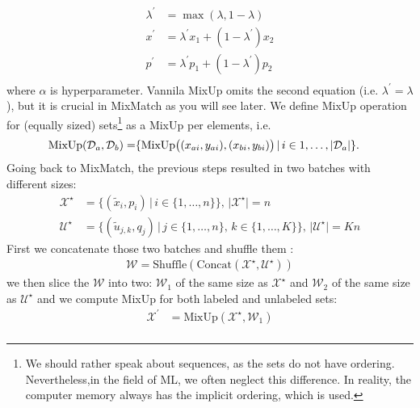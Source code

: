 \begin{enumerate}
\begin{align*}
                \lambda^\prime &= \max(\lambda,1-\lambda) \\
                x^\prime &= \lambda^\prime x_1 + (1-\lambda^\prime) x_2 \\
                p^\prime &= \lambda^\prime p_1 + (1-\lambda^\prime) p_2 \\
            \end{align*}
            where $\alpha$ is hyperparameter. Vannila MixUp omits the second equation (i.e. $\lambda^\prime = \lambda$), but it is crucial in MixMatch as you will
            see later. We define MixUp operation for (equally sized) sets\footnote{We should rather speak about sequences, as the sets do not have ordering. 
            Nevertheless,in the field of ML, we often neglect this difference. In reality, the computer memory always has the implicit ordering, which is used.} 
            as a MixUp per elements, i.e.
            \begin{equation*}
                \begin{split}
                    \text{MixUp}(\mathcal{D}_a,\mathcal{D}_b) = & \{\text{MixUp} \big{(} (x_{ai},y_{ai}),(x_{bi},y_{bi}) \big{)}\,|\,i \in {1,\dots,|\mathcal{D}_a|}  \}.
                \end{split}
            \end{equation*}
        Going back to MixMatch, the previous steps resulted in two batches with different sizes:
            \begin{align*}
                \mathcal{X}^\star &= \{ (\tilde{x}_i,p_i)\,|\, i \in \{1,\dots,n\}  \}, \, |\mathcal{X}^\star| = n \\
                \mathcal{U}^\star &= \{ (\tilde{u}_{j,k},q_j)\,|\, j \in \{1,\dots,n\},\,k \in \{1,\dots,K\}  \}, \, |\mathcal{U}^\star| = Kn 
            \end{align*}
        First we concatenate those two batches and shuffle them :
            \begin{align*}
                \mathcal{W} = \text{Shuffle}(\text{Concat}(\mathcal{X}^\star,\mathcal{U}^\star))
            \end{align*}
        we then slice the $\mathcal{W}$ into two: $\mathcal{W}_1$ of the same size as $\mathcal{X}^\star$ and $\mathcal{W}_2$ of the same size 
        as $\mathcal{U}^\star$ and we compute MixUp for both labeled and unlabeled sets:
        \begin{align*}
            \mathcal{X}^\prime &= \text{MixUp}(\mathcal{X}^\star,\mathcal{W}_1) \\

\end{align*}
\end{enumerate}
